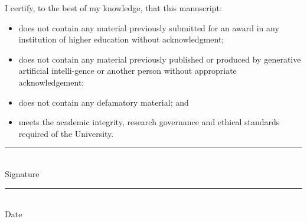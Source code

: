 
\begin{flushleft}
    \normalsize
    I certify, to the best of my knowledge, that this manuscript: 
    \begin{itemize}[leftmargin=11pt]
        \item does not contain any material previously submitted for an award in any institution of higher education without acknowledgment; 
        \item does not contain any material previously published or produced by generative artificial intelli-gence or another person without appropriate acknowledgement; 
        \item does not contain any defamatory material; and 
        \item meets the academic integrity, research governance and ethical standards required of the University.
    \end{itemize}

\end{flushleft}

\vspace{1.5cm} 

\begin{minipage}[t]{5cm}
    \rule{\linewidth}{0.5pt} \\ 
    \vspace{1pt}
    Signature
\end{minipage}
\hfill 
\begin{minipage}[t]{5cm} 
    \rule{\linewidth}{0.5pt} \\ 
    \vspace{1pt}
    Date
\end{minipage}

\clearpage